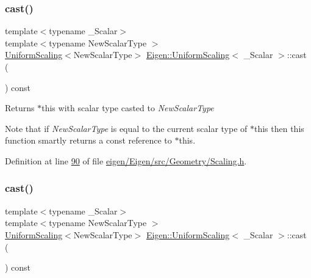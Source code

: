 \subsubsection{\texorpdfstring{cast()}{cast()}\hspace{0.1cm}{\footnotesize\ttfamily [1/2]}}
{\footnotesize\ttfamily template$<$typename \+\_\+\+Scalar$>$ \\
template$<$typename New\+Scalar\+Type $>$ \\
\hyperlink{class_eigen_1_1_uniform_scaling}{Uniform\+Scaling}$<$New\+Scalar\+Type$>$ \hyperlink{class_eigen_1_1_uniform_scaling}{Eigen\+::\+Uniform\+Scaling}$<$ \+\_\+\+Scalar $>$\+::cast (\begin{DoxyParamCaption}{ }\end{DoxyParamCaption}) const\hspace{0.3cm}{\ttfamily [inline]}}

\begin{DoxyReturn}{Returns}
{\ttfamily $\ast$this} with scalar type casted to {\itshape New\+Scalar\+Type} 
\end{DoxyReturn}
Note that if {\itshape New\+Scalar\+Type} is equal to the current scalar type of {\ttfamily $\ast$this} then this function smartly returns a const reference to {\ttfamily $\ast$this}. 

Definition at line \hyperlink{eigen_2_eigen_2src_2_geometry_2_scaling_8h_source_l00090}{90} of file \hyperlink{eigen_2_eigen_2src_2_geometry_2_scaling_8h_source}{eigen/\+Eigen/src/\+Geometry/\+Scaling.\+h}.

\mbox{\label{class_eigen_1_1_uniform_scaling_af93a9ee1d6efc102b65a197f3ea3d4cd}} 
\subsubsection{\texorpdfstring{cast()}{cast()}\hspace{0.1cm}{\footnotesize\ttfamily [2/2]}}
{\footnotesize\ttfamily template$<$typename \+\_\+\+Scalar$>$ \\
template$<$typename New\+Scalar\+Type $>$ \\
\hyperlink{class_eigen_1_1_uniform_scaling}{Uniform\+Scaling}$<$New\+Scalar\+Type$>$ \hyperlink{class_eigen_1_1_uniform_scaling}{Eigen\+::\+Uniform\+Scaling}$<$ \+\_\+\+Scalar $>$\+::cast (\begin{DoxyParamCaption}{ }\end{DoxyParamCaption}) const\hspace{0.3cm}{\ttfamily [inline]}}

